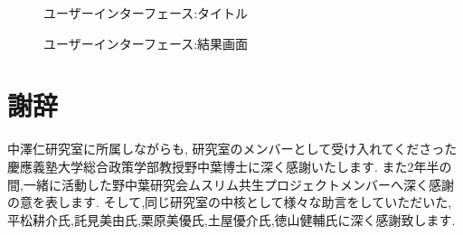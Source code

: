 \begin{figure}[htbp]
  \begin{minipage}{0.5\hsize}
    \begin{center}
    \end{center}
    \caption{ユーザーインターフェース:タイトル}
    \label{fig:halal_checker_title}
  \end{minipage}
  \begin{minipage}{0.5\hsize}
    \begin{center}
    \end{center}
    \caption{ユーザーインターフェース:結果画面}
    \label{fig:halal_checker_result}
  \end{minipage}
\end{figure}

\section{謝辞}
中澤仁研究室に所属しながらも, 研究室のメンバーとして受け入れてくださった慶應義塾大学総合政策学部教授野中葉博士に深く感謝いたします.
また2年半の間,一緒に活動した野中葉研究会ムスリム共生プロジェクトメンバーへ深く感謝の意を表します.
そして,同じ研究室の中核として様々な助言をしていただいた,平松耕介氏,託見美由氏,栗原美優氏,土屋優介氏,徳山健輔氏に深く感謝致します.

